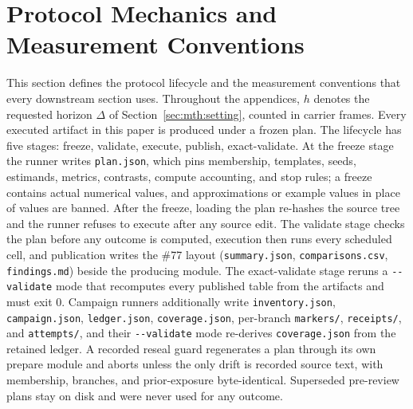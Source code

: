 \section{Protocol Mechanics and Measurement Conventions}
\label{sec:app:protocol}

This section defines the protocol lifecycle and the measurement conventions that every downstream section uses. Throughout the appendices, $h$ denotes the requested horizon $\Delta$ of Section~\ref{sec:mth:setting}, counted in carrier frames.
Every executed artifact in this paper is produced under a frozen plan. The lifecycle has five stages: freeze, validate, execute, publish, exact-validate. At the freeze stage the runner writes \texttt{plan.json}, which pins membership, templates, seeds, estimands, metrics, contrasts, compute accounting, and stop rules; a freeze contains actual numerical values, and approximations or example values in place of values are banned. After the freeze, loading the plan re-hashes the source tree and the runner refuses to execute after any source edit. The validate stage checks the plan before any outcome is computed, execution then runs every scheduled cell, and publication writes the \#77 layout (\texttt{summary.json}, \texttt{comparisons.csv}, \texttt{findings.md}) beside the producing module. The exact-validate stage reruns a \texttt{-{}-validate} mode that recomputes every published table from the artifacts and must exit 0. Campaign runners additionally write \texttt{inventory.json}, \texttt{campaign.json}, \texttt{ledger.json}, \texttt{coverage.json}, per-branch \texttt{markers/}, \texttt{receipts/}, and \texttt{attempts/}, and their \texttt{-{}-validate} mode re-derives \texttt{coverage.json} from the retained ledger. A recorded reseal guard regenerates a plan through its own prepare module and aborts unless the only drift is recorded source text, with membership, branches, and prior-exposure byte-identical. Superseded pre-review plans stay on disk and were never used for any outcome.

